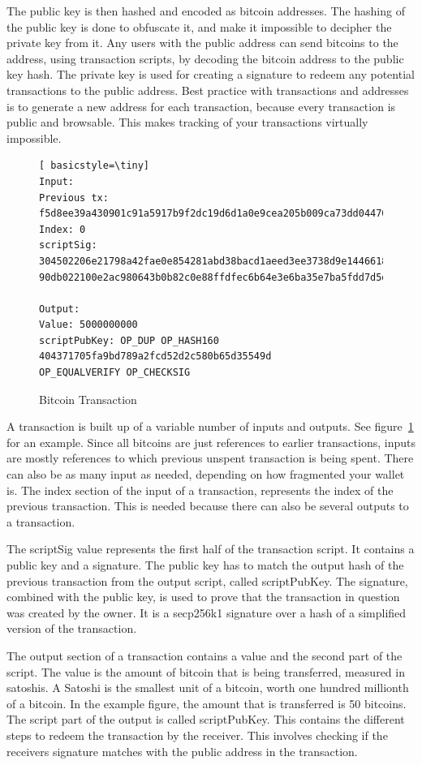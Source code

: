 \documentclass[11pt]{article}
\begin{document}
The public key is then hashed and encoded as bitcoin addresses. The hashing of the public key is done to obfuscate it, and make it impossible to decipher the private key from it. Any users with the public address can send bitcoins to the address, using transaction scripts, by decoding the bitcoin address to the public key hash. The private key is used for creating a signature to redeem any potential transactions to the public address. Best practice with transactions and addresses is to generate a new address for each transaction, because every transaction is public and browsable. This makes tracking of your transactions virtually impossible. 

\begin{figure}[h!]
	\begin{lstlisting}[ basicstyle=\tiny]
Input:
Previous tx: f5d8ee39a430901c91a5917b9f2dc19d6d1a0e9cea205b009ca73dd04470b9a6
Index: 0
scriptSig: 304502206e21798a42fae0e854281abd38bacd1aeed3ee3738d9e1446618c4571d10
90db022100e2ac980643b0b82c0e88ffdfec6b64e3e6ba35e7ba5fdd7d5d6cc8d25c6b241501

Output:
Value: 5000000000
scriptPubKey: OP_DUP OP_HASH160 404371705fa9bd789a2fcd52d2c580b65d35549d
OP_EQUALVERIFY OP_CHECKSIG
	\end{lstlisting}
	\caption{Bitcoin Transaction}
	\label{fig:transaction}
\end{figure}

A transaction is built up of a variable number of inputs and outputs. See figure~\ref{fig:transaction}  for an example. Since all bitcoins are just references to earlier transactions, inputs are mostly references to which previous unspent transaction is being spent. There can also be as many input as needed, depending on how fragmented your wallet is. The index section of the input of a transaction, represents the index of the previous transaction. This is needed because there can also be several outputs to a transaction.

The scriptSig value represents the first half of the transaction script. It contains a public key and a signature. The public key has to match the output hash of the previous transaction from the output script, called scriptPubKey. The signature, combined with the public key, is used to prove that the transaction in question was created by the owner. It is a secp256k1 signature over a hash of a simplified version of the transaction. 

The output section of a transaction contains a value and the second part of the script. The value is the amount of bitcoin that is being transferred, measured in satoshis. A Satoshi is the smallest unit of a bitcoin, worth one hundred millionth of a bitcoin. In the example figure, the amount that is transferred is 50 bitcoins. The script part of the output is called scriptPubKey. This contains the different steps to redeem the transaction by the receiver. This involves checking if the receivers signature matches with the public address in the transaction. 
\end{document}
